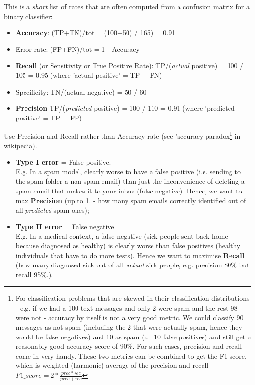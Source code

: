 \documentclass[11pt]{article}
\begin{document}
This is a \textit{short} list of rates that are often computed from a confusion matrix for a binary classifier:
\begin{itemize}
	\item \textbf{Accuracy}: (TP+TN)/tot = (100+50) / 165) = 0.91
	\item Error rate: (FP+FN)/tot = 1 - Accuracy
	\item \textbf{Recall} (or Sensitivity or True Positive Rate): TP/(\textit{actual} positive) = 100 / 105 = 0.95 (where 'actual positive' = TP + FN)
	\item Specificity: TN/(actual negative) = 50 / 60
	\item \textbf{Precision} TP/(\textit{predicted} positive) = 100 / 110 = 0.91 (where 'predicted positive' = TP + FP)
\end{itemize}
Use Precision and Recall rather than Accuracy rate (see 'accuracy paradox\footnote{For classification problems that are skewed in their classification distributions - e.g. if we had a 100 text messages and only 2 were spam and the rest 98 were not - accuracy by itself is not a very good metric. We could classify 90 messages as not spam (including the 2 that were actually spam, hence they would be false negatives) and 10 as spam (all 10 false positives) and still get a reasonably good accuracy score of 90\%. For such cases, precision and recall come in very handy. These two metrics can be combined to get the F1 score, which is weighted (harmonic) average of the precision and recall $F1\_score = 2 * \frac{prec * rec}{prec + rec}$} in wikipedia).

\begin{itemize}
	\item \textbf{Type I error} = False positive. \\ E.g. In a spam model, clearly worse to have a false positive (i.e. sending to the spam folder a non-spam email) than just the inconvenience of deleting a spam email that makes it to your inbox (false negative). Hence, we want to max \textbf{Precision} (up to 1. - how many spam emails correctly identified out of all \textit{predicted} spam ones);
	\item \textbf{Type II error} = False negative \\ E.g. In a medical context, a false negative (sick people sent back home because diagnosed as healthy) is clearly worse than false positives (healthy individuals that have to do more tests). Hence we want to maximise \textbf{Recall} (how many diagnosed sick out of all \textit{actual} sick people, e.g. precision 80\% but recall 95\%.).
\end{itemize}
\end{document}
